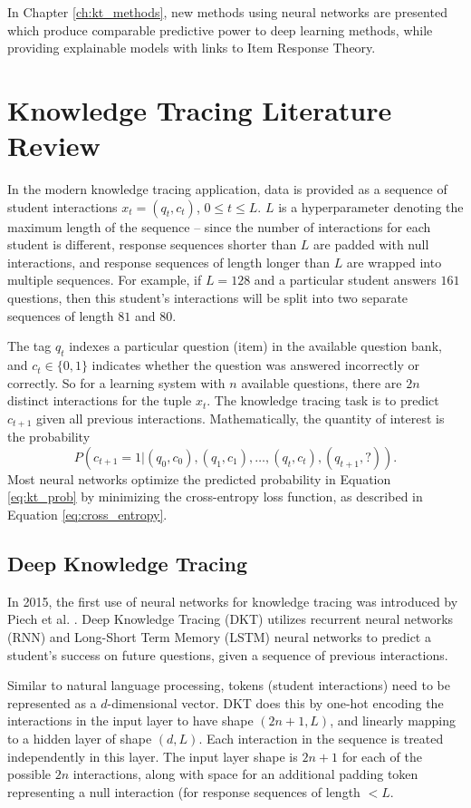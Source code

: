 In Chapter \ref{ch:kt_methods}, new methods using neural networks are presented which produce comparable predictive power to deep learning methods, while providing explainable models with links to Item Response Theory.


\section{Knowledge Tracing Literature Review}\label{sec:kt_lit}
In the modern knowledge tracing application, data is provided as a sequence of student interactions $x_t = (q_t, c_t)$, $0 \leq t \leq L$. $L$ is a hyperparameter denoting the maximum length of the sequence -- since the number of interactions for each student is different, response sequences shorter than $L$ are padded with null interactions, and response sequences of length longer than $L$ are wrapped into multiple sequences. For example, if $L=128$ and a particular student answers $161$ questions, then this student's interactions will be split into two separate sequences of length $81$ and $80$.

The tag $q_t$ indexes a particular question (item) in the available question bank, and $c_t \in\{0,1\}$ indicates whether the question was answered incorrectly or correctly. So for a learning system with $n$ available questions, there are $2n$ distinct interactions for the tuple $x_t$. The knowledge tracing task is to predict $c_{t+1}$ given all previous interactions. Mathematically, the quantity of interest is the probability 
\begin{equation}
  P(c_{t+1} = 1 | (q_0,c_0), (q_1,c_1),\ldots,(q_t, c_t), (q_{t+1}, ?)).
  \label{eq:kt_prob}
\end{equation}
Most neural networks optimize the predicted probability in Equation \ref{eq:kt_prob} by  minimizing the cross-entropy loss function, as described in Equation \ref{eq:cross_entropy}.

\subsection{Deep Knowledge Tracing}
In 2015, the first use of neural networks for knowledge tracing was introduced by Piech et al. \cite{piech2015}. Deep Knowledge Tracing (DKT) utilizes recurrent neural networks (RNN) and Long-Short Term Memory (LSTM) neural networks to predict a student's success on future questions, given a sequence of previous interactions. 

Similar to natural language processing, tokens (student interactions) need to be represented as a $d$-dimensional vector. DKT does this by one-hot encoding the interactions in the input layer to have shape $(2n+1, L)$,  and linearly mapping to a hidden layer of shape $(d, L)$. Each interaction in the sequence is treated independently in this layer. The input layer shape is $2n+1$ for each of the possible $2n$ interactions, along with space for an additional padding token representing a null interaction (for response sequences of length $< L$.

